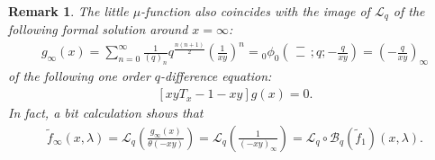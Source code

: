 \documentclass[a4paper]{article}
\newcommand{\hyper}[4]{\left( \begin{matrix} #1 \\ #2 \end{matrix};#3;#4\right)}
\numberwithin{equation}{section}
\theoremstyle{plain}
\newtheorem{rmk}{Remark}
\begin{document}
\begin{rmk}
The little $\mu$-function also coincides with the image of $\mathcal{L}_q$ of the following formal solution around $x=\infty$: 
\begin{align*}
g_\infty(x)=\sum_{n=0}^\infty\frac{1}{(q)_n}q^\frac{n(n+1)}{2}\left(\frac{1}{xy}\right)^n={}_0\phi_0\hyper{-}{-}{q}{-\frac{q}{xy}}=\left(-\frac{q}{xy}\right)_\infty
\end{align*}
of the following one order $q$-difference equation: 
\begin{align}
\label{eq: RB equation}
[xyT_x-1-xy]g(x)=0. 
\end{align} 
In fact, a bit calculation shows that
\begin{align*}
\widetilde{f}_\infty(x,\lambda)=\mathcal{L}_q\left(\frac{g_\infty(x)}{\theta(-xy)}\right)=\mathcal{L}_q\left(\frac{1}{(-xy)_\infty}\right)=\mathcal{L}_q\circ\mathcal{B}_q\left(\widetilde{f}_1\right)(x,\lambda). 
\end{align*}

\end{rmk}
\end{document}

